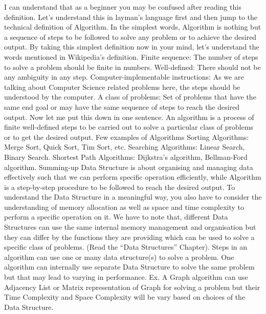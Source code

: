 I can understand that as a beginner you may be confused after reading this definition. Let’s understand this in layman’s language first and then jump to the technical definition of Algorithm.
In the simplest words, Algorithm is nothing but a sequence of steps to be followed to solve any problem or to achieve the desired output.
By taking this simplest definition now in your mind, let's understand the words mentioned in Wikipedia’s definition.
Finite sequence: The number of steps to solve a problem should be finite in numbers.
Well-defined: There should not be any ambiguity in any step.
Computer-implementable instructions: As we are talking about Computer Science related problems here, the steps should be understood by the computer.
A class of problems: Set of problems that have the same end goal or may have the same sequence of steps to reach the desired output.
Now let me put this down in one sentence.
An algorithm is a process of finite well-defined steps to be carried out to solve a particular class of problems or to get the desired output.
Few examples of Algorithms
Sorting Algorithms: Merge Sort, Quick Sort, Tim Sort, etc.
Searching Algorithms: Linear Search, Binary Search.
Shortest Path Algorithms: Dijkstra’s algorithm, Bellman-Ford algorithm.
Summing-up
Data Structure is about organising and managing data effectively such that we can perform specific operation efficiently, while Algorithm is a step-by-step procedure to be followed to reach the desired output.
To understand the Data Structure in a meaningful way, you also have to consider the understanding of memory allocation as well as space and time complexity to perform a specific operation on it.
We have to note that, different Data Structures can use the same internal memory management and organisation but they can differ by the functions they are providing which can be used to solve a specific class of problems. (Read the “Data Structures” Chapter).
Steps in an algorithm can use one or many data structure(s) to solve a problem.
One algorithm can internally use separate Data Structure to solve the same problem but that may lead to varying in performance. Ex. A Graph algorithm can use Adjacency List or Matrix representation of Graph for solving a problem but their Time Complexity and Space Complexity will be vary based on choices of the Data Structure.
